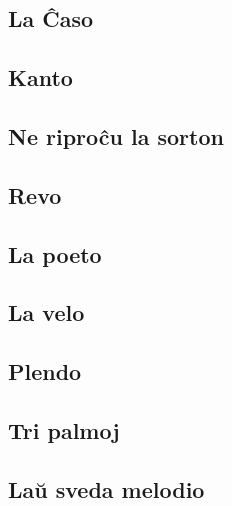 \documentclass[a5paper,11pt,openany,twoside]{book}
\begin{document}
\subsection{La \^Caso}
\label{cxaso}


\subsection{Kanto}
\label{kanto}

\subsection{Ne ripro\^cu la sorton}
\label{riprocxu}

\subsection{Revo}
\label{revo}


\subsection{La poeto}
\label{poeto}


\subsection{La velo}
\label{velo}


\subsection{Plendo}
\label{plendo}


\vspace*{-5ex} %

\subsection{Tri palmoj}
\label{palmoj}


\subsection{La\u u sveda melodio}
\label{sveda}

\end{document}
